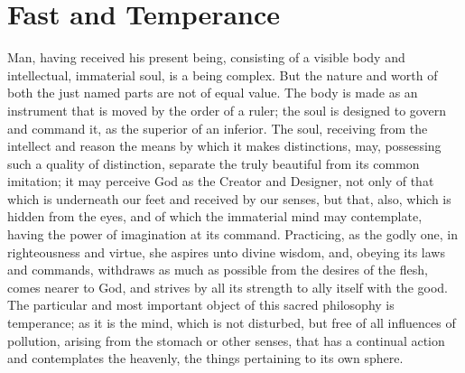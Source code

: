 \chapter{Fast and Temperance}

Man, having received his present being, 
consisting of a visible body and intellectual,
immaterial soul, is a being complex. 
But the nature and worth of both the just 
named parts are not of equal value. The body
is made as an instrument that is moved by the 
order of a ruler; the soul is designed to govern 
and command it, as the superior of an inferior. 
The soul, receiving from the intellect and reason
the means by which it makes distinctions, 
may, possessing such a quality of distinction, 
separate the truly beautiful from its common 
imitation; it may perceive God as the Creator 
and Designer, not only of that which is underneath
our feet and received by our senses, but 
that, also, which is hidden from the eyes, and 
of which the immaterial mind may contemplate, 
having the power of imagination at its command. 
Practicing, as the godly one, in righteousness 
and virtue, she aspires unto divine wisdom, and, 
obeying its laws and commands, withdraws as 
much as possible from the desires of the flesh, 
comes nearer to God, and strives by all its 
strength to ally itself with the good. The 
particular and most important object of this 
sacred philosophy is temperance; as it is the 
mind, which is not disturbed, but free of all influences
of pollution, arising from the stomach 
or other senses, that has a continual action and 
contemplates the heavenly, the things pertaining
to its own sphere. 

